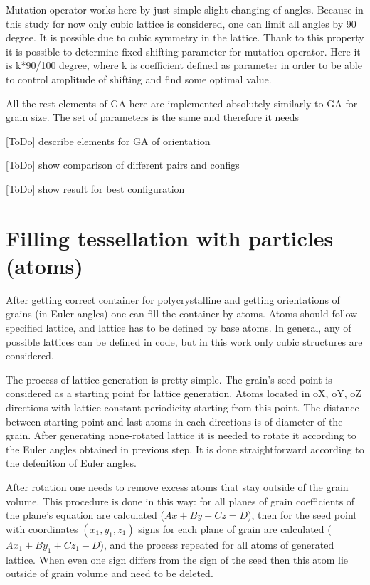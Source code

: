 \documentclass[12pt]{report}
\begin{document}
Mutation operator works here by just simple slight changing of angles. Because in this study for now only cubic lattice is considered, one can limit all angles by 90 degree. It is possible due to cubic symmetry in the lattice. Thank to this property it is possible to determine fixed shifting parameter for mutation operator. Here it is k*90/100 degree, where k is coefficient defined as parameter in order to be able to control amplitude of shifting and find some optimal value.

All the rest elements of GA here are implemented absolutely similarly to GA for grain size. The set of parameters is the same and therefore it needs 



[ToDo] describe elements for GA of orientation

[ToDo] show comparison of different pairs and configs

[ToDo] show result for best configuration


\section{Filling tessellation with particles (atoms)}

After getting correct container for polycrystalline and getting orientations of grains (in Euler angles) one can fill the container by atoms. Atoms should follow specified lattice, and lattice has to be defined by base atoms. In general, any of possible lattices can be defined in code, but in this work only cubic structures are considered.

The process of lattice generation is pretty simple. The grain's seed point is considered as a starting point for lattice generation. Atoms located in oX, oY, oZ directions with lattice constant periodicity starting from this point. The distance between starting point and last atoms in each directions is of diameter of the grain. After generating none-rotated lattice it is needed to rotate it according to the Euler angles obtained in previous step. It is done straightforward according to the defenition of Euler angles. 

After rotation one needs to remove excess atoms that stay outside of the grain volume. This procedure is done in this way: for all planes of grain coefficients of the plane's equation are calculated ($Ax + By + Cz = D$), then for the seed point with coordinates $(x_1, y_1, z_1)$ signs for each plane of grain are calculated ($Ax_1 + By_1 + Cz_1 - D$), and the process repeated for all atoms of generated lattice. When even one sign differs from the sign of the seed then this atom lie outside of grain volume and need to be deleted.
\end{document}
